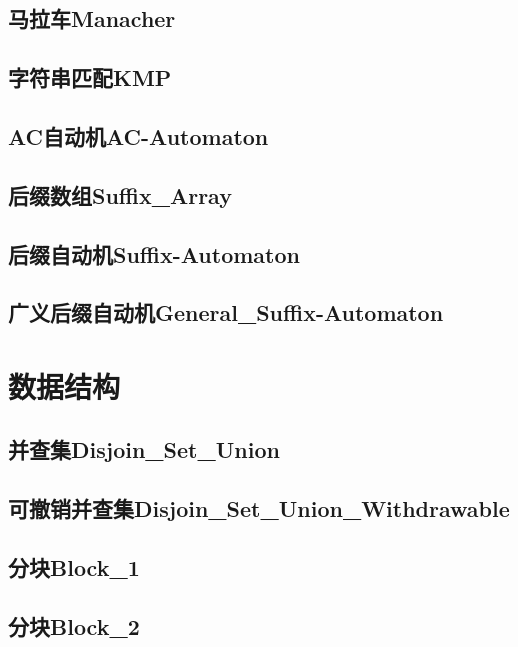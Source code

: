\documentclass[10pt,a4paper]{article}
\begin{document}
\subsection{马拉车Manacher}

\subsection{字符串匹配KMP}

\subsection{AC自动机AC-Automaton}

\subsection{后缀数组Suffix\_Array}

\subsection{后缀自动机Suffix-Automaton}

\subsection{广义后缀自动机General\_Suffix-Automaton}


\newpage
\section{数据结构}
\subsection{并查集Disjoin\_Set\_Union}

\subsection{可撤销并查集Disjoin\_Set\_Union\_Withdrawable}

\subsection{分块Block\_1}

\subsection{分块Block\_2}

\end{document}
